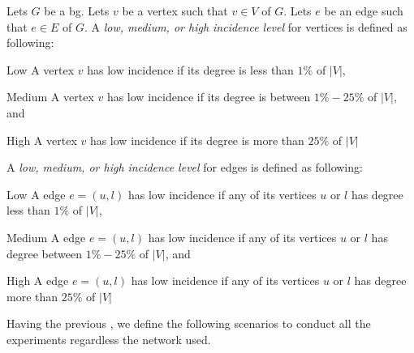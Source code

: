 \begin{definition}\label{def:exp:incidence}
Lets $G$ be a \acrlong{bg}.
Lets $v$ be a vertex such that $v \in V$ of $G$.
Lets $e$ be an edge such that $e \in E$ of $G$.
A \emph{low, medium, or high incidence level} for vertices is defined as following:
\begin{inparaenum}
  \item[Low] A vertex $v$ has low incidence if its degree is less than $1\%$ of $|V|$,
  \item[Medium] A vertex $v$ has low incidence if its degree is between $1\%-25\%$ of $|V|$, and
  \item[High] A vertex $v$ has low incidence if its degree is more than $25\%$ of $|V|$
\end{inparaenum}
A \emph{low, medium, or high incidence level} for edges is defined as following:
\begin{inparaenum}
  \item[Low] A edge $e = (u, l)$ has low incidence if any of its vertices $u$ or $l$ has degree less than $1\%$ of $|V|$,
  \item[Medium] A edge $e = (u, l)$ has low incidence if any of its vertices $u$ or $l$ has degree between $1\%-25\%$ of $|V|$, and
  \item[High]  A edge $e = (u, l)$ has low incidence if any of its vertices $u$ or $l$ has degree more than $25\%$ of $|V|$
\end{inparaenum}
\end{definition}


Having the previous , we define the following scenarios to conduct all the experiments regardless the network used.

